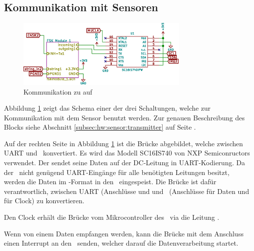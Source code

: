 \subsection{Kommunikation mit Sensoren}
\label{subsec:hw:master:sensorcomm}


\begin{figure}[h!t]
    \centering
    \includegraphics[width=0.75\textwidth]{images/superv-sch/supervisor--sch--comms.eps}
    \caption[\Master: Schema Kommunikation]{Kommunikation zu \Sensor auf \Master}
    \label{fig:sch:master:comms}
\end{figure}

Abbildung     \ref{fig:sch:master:comms}     zeigt    das     Schema     einer
der    drei     Schaltungen,    welche     zur    Kommunikation     mit    dem
Sensor    benutzt     werden. Zur    genauen    Beschreibung     des    Blocks
 siehe Abschnitt \ref{subsec:hw:sensor:transmitter} auf
Seite \pageref{subsec:hw:sensor:transmitter}.

Auf der rechten Seite in Abbildung \ref{fig:sch:master:comms} ist die Br\"ucke
 abgebildet,  welche zwischen UART und  \ISC~konvertiert. Es wird das
Modell  SC16IS740 von  NXP Semiconructors  \cite{datasheet:uarti2c} verwendet.
Der \Sensor  sendet seine Daten  auf der DC-Leitung in  UART-Kodierung. Da der
\Raspi~nicht  gen\"ugend  UART-Eing\"ange  f\"ur alle  ben\"otigten  Leitungen
besitzt,  werden  die  Daten  im \ISC-Format  in  den  \Raspi~eingespeist. Die
Br\"ucke   ist  daf\"ur verantwortlich,  zwischen UART  (Anschl\"usse
  und   und  \ISC~(Anschl\"usse   f\"ur Daten  und
 f\"ur Clock) zu konvertieren.

Den Clock erh\"alt die Br\"ucke vom Mikrocontroller des \Raspi~via die Leitung
.

Wenn  von einem  \Sensor Daten  empfangen werden,  kann die  Br\"ucke mit  dem
Anschluss  einen Interrupt an den \Raspi~senden, welcher darauf die
Datenverarbeitung startet.

